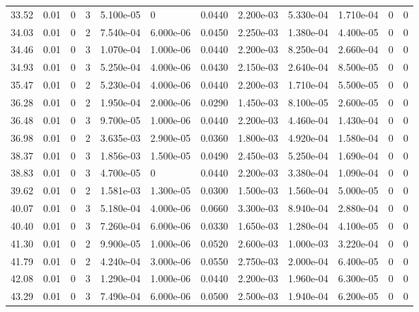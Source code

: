 \documentclass[preview]{standalone}
\begin{document}
{{{\begin{tabular}{L{1.2cm}C{1.2cm} C{0.3cm}C{0.5cm} C{1.4cm}C{1.4cm} C{1.4cm}C{1.4cm} C{1.6cm}C{1.6cm} C{1.6cm}C{1.6cm}}
  33.52  &  0.01  & 0     &  3 &  5.100e-05  & 0  &  0.0440&   2.200e-03& 5.330e-04 & 1.710e-04   &  0 & 0  \\ 
  34.03  &  0.01  & 0     &  2 &  7.540e-04  & 6.000e-06  &  0.0450&   2.250e-03& 1.380e-04 & 4.400e-05   &  0 & 0  \\ 
  34.46  &  0.01  & 0     &  3 &  1.070e-04  & 1.000e-06  &  0.0440&   2.200e-03& 8.250e-04 & 2.660e-04   &  0 & 0  \\ 
  34.93  &  0.01  & 0     &  3 &  5.250e-04  & 4.000e-06  &  0.0430&   2.150e-03& 2.640e-04 & 8.500e-05   &  0 & 0  \\ 
  35.47  &  0.01  & 0     &  2 &  5.230e-04  & 4.000e-06  &  0.0440&   2.200e-03& 1.710e-04 & 5.500e-05   &  0 & 0  \\ 
  36.28  &  0.01  & 0     &  2 &  1.950e-04  & 2.000e-06  &  0.0290&   1.450e-03& 8.100e-05 & 2.600e-05   &  0 & 0  \\ 
  36.48  &  0.01  & 0     &  3 &  9.700e-05  & 1.000e-06  &  0.0440&   2.200e-03& 4.460e-04 & 1.430e-04   &  0 & 0  \\ 
  36.98  &  0.01  & 0     &  2 &  3.635e-03  & 2.900e-05  &  0.0360&   1.800e-03& 4.920e-04 & 1.580e-04   &  0 & 0  \\ 
  38.37  &  0.01  & 0     &  3 &  1.856e-03  & 1.500e-05  &  0.0490&   2.450e-03& 5.250e-04 & 1.690e-04   &  0 & 0  \\ 
  38.83  &  0.01  & 0     &  3 &  4.700e-05  & 0  &  0.0440&   2.200e-03& 3.380e-04 & 1.090e-04   &  0 & 0  \\ 
  39.62  &  0.01  & 0     &  2 &  1.581e-03  & 1.300e-05  &  0.0300&   1.500e-03& 1.560e-04 & 5.000e-05   &  0 & 0  \\ 
  40.07  &  0.01  & 0     &  3 &  5.180e-04  & 4.000e-06  &  0.0660&   3.300e-03& 8.940e-04 & 2.880e-04   &  0 & 0  \\ 
  40.40  &  0.01  & 0     &  3 &  7.260e-04  & 6.000e-06  &  0.0330&   1.650e-03& 1.280e-04 & 4.100e-05   &  0 & 0  \\ 
  41.30  &  0.01  & 0     &  2 &  9.900e-05  & 1.000e-06  &  0.0520&   2.600e-03& 1.000e-03 & 3.220e-04   &  0 & 0  \\ 
  41.79  &  0.01  & 0     &  2 &  4.240e-04  & 3.000e-06  &  0.0550&   2.750e-03& 2.000e-04 & 6.400e-05   &  0 & 0  \\ 
  42.08  &  0.01  & 0     &  3 &  1.290e-04  & 1.000e-06  &  0.0440&   2.200e-03& 1.960e-04 & 6.300e-05   &  0 & 0  \\ 
  43.29  &  0.01  & 0     &  3 &  7.490e-04  & 6.000e-06  &  0.0500&   2.500e-03& 1.940e-04 & 6.200e-05   &  0 & 0  \\ 

\end{tabular}}}}
\end{document}

